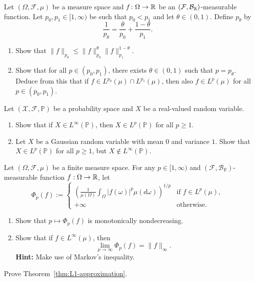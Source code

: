 \begin{problem}
		Let $(\Omega,\mathcal{F},\mu)$ be a measure space and $f\colon\Omega\to\mathbb R$ be an $(\mathcal{F},\mathcal{B}_{\mathbb R})$-measurable function. Let $p_0,p_1\in[1,
		\infty)$ be such that $p_0<p_1$ and let $\theta\in(0,1)$. Define $p_\theta$ by
		\[
			\frac{1}{p_\theta} = \frac{\theta}{p_0} + \frac{1-\theta}{p_1}.
		\]
		\begin{enumerate}[label={(\alph*)}]
			\item Show that $\|f\|_{p_\theta}\le \|f\|_{p_0}^\theta\|f\|_{p_1}^{1-\theta}$.
			\item Show that for all $p\in(p_0,p_1)$, there exists $\theta\in(0,1)$ such that $p=p_\theta$. Deduce from this that if $f\in L^{p_0}(\mu)\cap L^{p_1}(\mu)$, then also $f\in L^p(\mu)$ for all $p\in(p_0,p_1)$.
		\end{enumerate}
\end{problem}

\begin{problem}
Let $(\mathcal{X},\mathcal{F},\mathbb{P})$ be a probability space and $X$ be a real-valued random variable.
	\begin{enumerate}[label={(\alph*)}]
		\item Show that if $X\in L^\infty(\mathbb{P})$, then $X\in L^p(\mathbb{P})$ for all $p\ge 1$.
		\item Let $X$ be a Gaussian random variable with mean $0$ and variance $1$. Show that $X\in L^p(\mathbb{P})$ for all $p\ge 1$, but $X\notin L^\infty(\mathbb{P})$.
	\end{enumerate}
\end{problem}

\begin{problem}
	Let $(\Omega,\mathcal{F},\mu)$ be a finite measure space. For any $p\in[1,\infty)$ and $(\mathcal{F},\mathcal{B}_\mathbb{R})$-measurable function $f:\Omega\to\mathbb R$, let 
	\[
		\Phi_p(f) := \begin{cases}\displaystyle
			\left(\frac{1}{\mu(\Omega)}\int_\Omega |f(\omega)|^p \mu(d\omega)\right)^{1/p} &\text{if $f\in L^p(\mu)$},\\
			+\infty &\text{otherwise}.
		\end{cases}
	\]
	\begin{enumerate}[label={(\alph*)}]
		\item Show that $p\mapsto \Phi_p(f)$ is monotonically nondecreasing.
		\item Show that if $f\in L^\infty(\mu)$, then
		\[
			\lim_{p\to\infty} \Phi_p(f) = \|f\|_\infty.
		\]
			\textbf{Hint:} Make use of Markov's inequality.
	\end{enumerate}
\end{problem}

\begin{problem}
	Prove Theorem~\ref{thm:L1-approximation}.
\end{problem}
